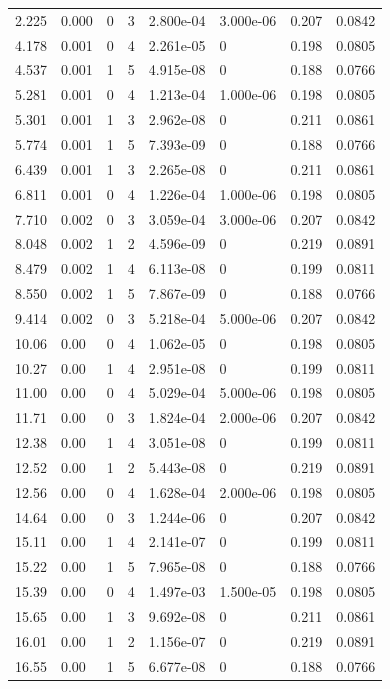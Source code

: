 \documentclass[preview]{standalone}
\begin{document}
{{\begin{tabular}{L{1.2cm}C{1.2cm} C{0.3cm}C{0.5cm} C{1.4cm}C{1.4cm} C{1.4cm}C{1.4cm}}
  2.225  &  0.000  & 0     &  3 &  2.800e-04  & 3.000e-06  & 0.207 &  0.0842   \\ 
  4.178  &  0.001  & 0     &  4 &  2.261e-05  & 0  & 0.198 &  0.0805   \\ 
  4.537  &  0.001  & 1     &  5 &  4.915e-08  & 0  & 0.188 &  0.0766   \\ 
  5.281  &  0.001  & 0     &  4 &  1.213e-04  & 1.000e-06  & 0.198 &  0.0805   \\ 
  5.301  &  0.001  & 1     &  3 &  2.962e-08  & 0  & 0.211 &  0.0861   \\ 
  5.774  &  0.001  & 1     &  5 &  7.393e-09  & 0  & 0.188 &  0.0766   \\ 
  6.439  &  0.001  & 1     &  3 &  2.265e-08  & 0  & 0.211 &  0.0861   \\ 
  6.811  &  0.001  & 0     &  4 &  1.226e-04  & 1.000e-06  & 0.198 &  0.0805   \\ 
  7.710  &  0.002  & 0     &  3 &  3.059e-04  & 3.000e-06  & 0.207 &  0.0842   \\ 
  8.048  &  0.002  & 1     &  2 &  4.596e-09  & 0  & 0.219 &  0.0891   \\ 
  8.479  &  0.002  & 1     &  4 &  6.113e-08  & 0  & 0.199 &  0.0811   \\ 
  8.550  &  0.002  & 1     &  5 &  7.867e-09  & 0  & 0.188 &  0.0766   \\ 
  9.414  &  0.002  & 0     &  3 &  5.218e-04  & 5.000e-06  & 0.207 &  0.0842   \\ 
  10.06  &  0.00  & 0     &  4 &  1.062e-05  & 0  & 0.198 &  0.0805   \\ 
  10.27  &  0.00  & 1     &  4 &  2.951e-08  & 0  & 0.199 &  0.0811   \\ 
  11.00  &  0.00  & 0     &  4 &  5.029e-04  & 5.000e-06  & 0.198 &  0.0805   \\ 
  11.71  &  0.00  & 0     &  3 &  1.824e-04  & 2.000e-06  & 0.207 &  0.0842   \\ 
  12.38  &  0.00  & 1     &  4 &  3.051e-08  & 0  & 0.199 &  0.0811   \\ 
  12.52  &  0.00  & 1     &  2 &  5.443e-08  & 0  & 0.219 &  0.0891   \\ 
  12.56  &  0.00  & 0     &  4 &  1.628e-04  & 2.000e-06  & 0.198 &  0.0805   \\ 
  14.64  &  0.00  & 0     &  3 &  1.244e-06  & 0  & 0.207 &  0.0842   \\ 
  15.11  &  0.00  & 1     &  4 &  2.141e-07  & 0  & 0.199 &  0.0811   \\ 
  15.22  &  0.00  & 1     &  5 &  7.965e-08  & 0  & 0.188 &  0.0766   \\ 
  15.39  &  0.00  & 0     &  4 &  1.497e-03  & 1.500e-05  & 0.198 &  0.0805   \\ 
  15.65  &  0.00  & 1     &  3 &  9.692e-08  & 0  & 0.211 &  0.0861   \\ 
  16.01  &  0.00  & 1     &  2 &  1.156e-07  & 0  & 0.219 &  0.0891   \\ 
  16.55  &  0.00  & 1     &  5 &  6.677e-08  & 0  & 0.188 &  0.0766   \\ 
\hline 
\end{tabular} 

}}
\end{document}
